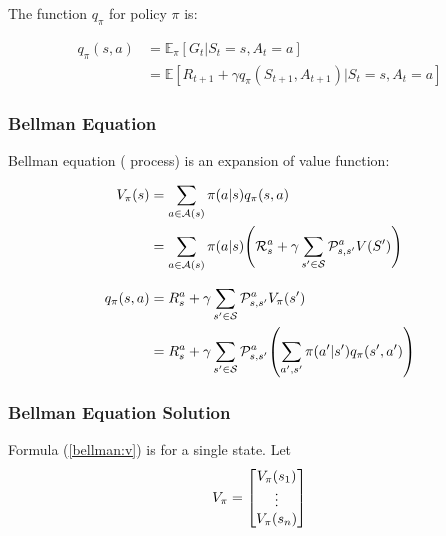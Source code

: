 The  function $q_\pi$ for policy $\pi$ is:

\begin{equation}
	\begin{aligned}
		q_{\pi}(s,a) &= \mathbb{E}_{\pi}[G_t|S_t=s,A_t=a] \\
					&= \mathbb{E}[R_{t+1} + \gamma q_{\pi}(S_{t+1}, A_{t+1})| S_t = s, A_t = a]
	\end{aligned}
\end{equation}

\subsubsection{Bellman Equation}


Bellman equation ( process) is an expansion of value function:

\begin{equation}\label{bellman:v}
	\begin{aligned}
		V_{\pi}(s) &= \sum_{a \in \mathcal{A}(s)} \pi(a|s) q_{\pi}(s,a) \\
		&= \sum_{a \in \mathcal{A}(s)} \pi(a|s) \mleft( \mathcal{R}_s^a + \gamma \sum_{s' \in \mathcal{S}} \mathcal{P}_{s,s'}^a V(S') \mright)
	\end{aligned}
\end{equation}

\begin{equation}
	\begin{aligned}
		q_{\pi}(s,a) &= R_s^a + \gamma \sum_{s' \in \mathcal{S}} \mathcal{P}_{s,s'}^a V_{\pi}(s') \\
		&= R_s^a + \gamma \sum_{s' \in \mathcal{S}} \mathcal{P}_{s,s'}^a \mleft( \sum_{a', s'} \pi(a'|s') q_{\pi}(s',a') \mright )
	\end{aligned}
\end{equation}



\subsubsection{Bellman Equation Solution}

Formula (\ref{bellman:v}) is for a single state. Let 
\begin{equation}
	V_{\pi} = \mleft [\begin{matrix}
 	V_{\pi}(s_1) \\
 	\vdots \\
 	V_{\pi}(s_n)
 \end{matrix} \mright ]
\end{equation}

